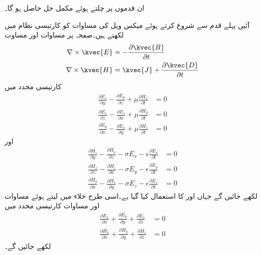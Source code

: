ان قدموں پر چلتے ہوئے مکمل حل حاصل ہو گا۔

آئیں پہلے قدم سے شروع کرتے ہوئے میکس ویل کی مساوات کو کارتیسی نظام میں لکھتے ہیں۔صفحہ  پر مساوات  اور  مساوت 
\begin{align}\label{مساوات_مویج_مستطیلی_پہلا_قدم_شروع}
\nabla \times \kvec{E}&=-\frac{\partial \kvec{B}}{\partial t}\\
\nabla \times \kvec{H}&=\kvec{J}+\frac{\partial \kvec{D}}{\partial t}
\end{align}
کارتیسی محدد میں
\begin{align}
\frac{\partial E_z}{\partial y}-\frac{\partial E_y}{\partial z}+\mu \frac{\partial H_x}{\partial t}&=0  \label{مساوات_مویج_میکس_ویل_الف}\\
\frac{\partial E_x}{\partial z}-\frac{\partial E_z}{\partial x}+\mu \frac{\partial H_y}{\partial t}&=0   \label{مساوات_مویج_میکس_ویل_ب}\\
\frac{\partial E_y}{\partial x}-\frac{\partial E_x}{\partial y}+\mu \frac{\partial H_z}{\partial t}&=0 \label{مساوات_مویج_میکس_ویل_پ}
\end{align}
اور
\begin{align}
\frac{\partial H_z}{\partial y}-\frac{\partial H_y}{\partial z}-\sigma E_x-\epsilon \frac{\partial E_x}{\partial t}&=0  \label{مساوات_مویج_میکس_ویل_ت}\\
\frac{\partial H_x}{\partial z}-\frac{\partial H_z}{\partial x}-\sigma E_y-\epsilon \frac{\partial E_y}{\partial t}&=0  \label{مساوات_مویج_میکس_ویل_ٹ}\\
\frac{\partial H_y}{\partial x}-\frac{\partial H_x}{\partial y}-\sigma E_z-\epsilon \frac{\partial E_z}{\partial t}&=0 \label{مساوات_مویج_میکس_ویل_ث}
\end{align}
لکھے جائیں گے جہاں  اور  کا استعمال کیا گیا ہے۔اسی طرح خلاء میں  لیتے ہوئے  مساوات  اور مساوات  کارتیسی محدد میں
\begin{align}
\frac{\partial E_x}{\partial x}+\frac{\partial E_y}{\partial y}+\frac{\partial E_z}{\partial z}&=0 \label{مساوات_مویج_میکس_ویل_ج}\\
\frac{\partial H_x}{\partial x}+\frac{\partial H_y}{\partial y}+\frac{\partial H_z}{\partial z}&=0 \label{مساوات_مویج_میکس_ویل_چ}
\end{align}
لکھے جائیں گے۔


